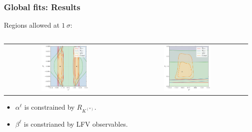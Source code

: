 \documentclass[mathserif, 10pt]{beamer}
\begin{document}
\begin{frame}
    \frametitle{Global fits: Results}
    Regions allowed at $1~\sigma$:
    \begin{columns}
        \begin{column}{0.4\textwidth}
            
        \end{column}
        \begin{column}{0.6\textwidth}        
            
        \end{column}
    \end{columns}
    \begin{center}
        \begin{tabular}{cc}
            \includegraphics[width=0.4\textwidth]{figures/alphabeta_l.pdf} & \includegraphics[width=0.4\textwidth]{figures/alphabeta_q.pdf}
        \end{tabular}
    \end{center}
    \begin{itemize}
        \item $\alpha^\ell$ is constrained by $R_{K^{(*)}}$.
        \item $\beta^\ell$ is constrianed by LFV observables.
    \end{itemize}
\end{frame}
\end{document}
